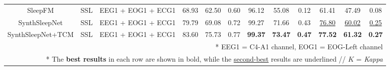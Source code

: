 \begin{table*}[!htbp]
{{\begin{tabular}{c|c|c|ccc|ccc|ccc}
SleepFM \cite{ref23}                                                                               & SSL                                                                                        & EEG1
  + EOG1 + ECG1                       & 68.93          & 62.50          & 0.60                                                                      & 96.12          & 55.08          & 0.12                                                          & 61.41          & 47.49          & 0.08                                                             \\
SynthSleepNet                                                                          & SSL                                                                                        & EEG1
  + EOG1 + ECG1                       & 79.79          & 69.08          & 0.72                                                                      & 99.27          & 71.66          & 0.43                                                          & \uline{76.80}  & \uline{60.02}  & \uline{0.25}                                                     \\
SynthSleepNet+TCM                                                                      & SSL                                                                                        & EEG1
  + EOG1 + ECG1                       & 83.60          & 75.73          & 0.77                                                                      & \textbf{99.37} & \textbf{73.47} & \textbf{0.47}                                                 & \textbf{77.52} & \textbf{61.32} & \textbf{0.27}                                                    \\
\hline
\multicolumn{12}{r}{* EEG1 = C4-A1 channel, EOG1 = EOG-Left channel} \\
\multicolumn{12}{r}{* The \textbf{best results} in each row are shown in bold, while the \uline{second-best} results are underlined // $K$ = \textit{Kappa}} \\
\end{tabular}}
}
\end{table*}